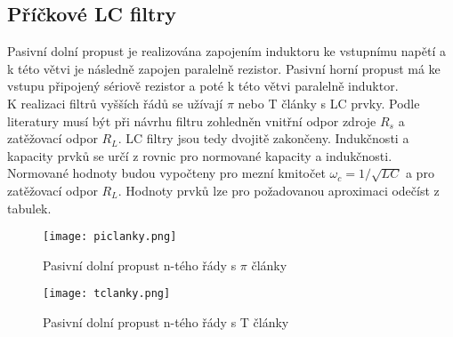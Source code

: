 \subsection{Příčkové LC filtry}\label{s:LC}
Pasivní dolní propust je realizována zapojením induktoru ke vstupnímu napětí a k této větvi je následně zapojen paralelně rezistor. Pasivní horní propust má ke vstupu připojený sériově rezistor a poté k této větvi paralelně induktor. \\
K realizaci filtrů vyšších řádů se užívají $\pi$ nebo T články s LC prvky. Podle literatury \cite{18} musí být při návrhu filtru zohledněn vnitřní odpor zdroje $R_s$ a zatěžovací odpor $R_L$. LC filtry jsou tedy dvojitě zakončeny. Indukčnosti a kapacity prvků se určí z rovnic pro normované kapacity a indukčnosti. Normované hodnoty budou vypočteny pro mezní kmitočet $\omega _c = 1/\sqrt{LC}$ a pro zatěžovací odpor $R_L$. Hodnoty prvků lze pro požadovanou aproximaci odečíst z tabulek. \\
\begin{figure}[h]
\centering
\texttt{[image: piclanky.png]}
\caption[Pasivní dolní propust n-tého řády s $\pi$ články]{Pasivní dolní propust n-tého řády s $\pi$ články \cite{18}}
\end{figure}
\begin{figure}[h]
\centering
\texttt{[image: tclanky.png]}
\caption[Pasivní dolní propust n-tého řády s T články]{Pasivní dolní propust n-tého řády s T články \cite{18}}
\end{figure}
\newpage

